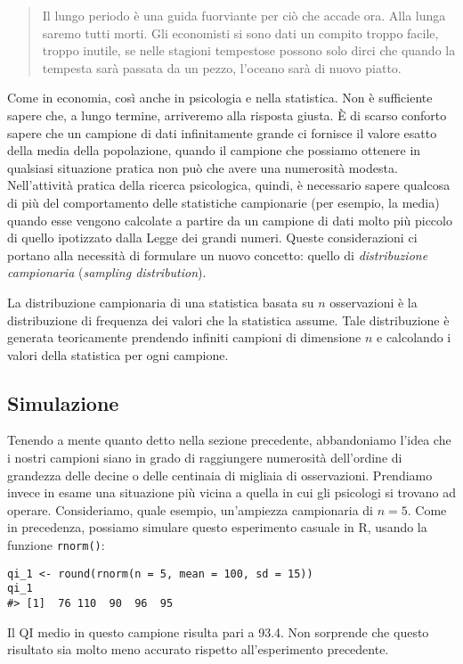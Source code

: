 \begin{quote}
Il lungo periodo è una guida fuorviante per ciò che accade ora.
Alla lunga saremo tutti morti.
Gli economisti si sono dati un compito troppo facile, troppo inutile, se nelle stagioni tempestose possono solo dirci che quando la tempesta sarà passata da un pezzo, l'oceano sarà di nuovo piatto.
\end{quote}

Come in economia, così anche in psicologia e nella statistica. 
Non è sufficiente sapere che, a lungo termine, arriveremo alla risposta giusta. 
È di scarso conforto sapere che un campione di dati infinitamente grande ci fornisce il valore esatto della media della popolazione, quando il campione che possiamo ottenere in qualsiasi situazione pratica non può che avere una numerosità modesta. 
Nell'attività pratica della ricerca psicologica, quindi, è necessario sapere qualcosa di più del comportamento delle statistiche campionarie (per esempio, la media) quando esse vengono calcolate a partire da un campione di dati molto più piccolo di quello ipotizzato dalla Legge dei grandi numeri.
Queste considerazioni ci portano alla necessità di formulare un nuovo concetto: quello di \emph{distribuzione campionaria} (\emph{sampling distribution}).

\begin{defn}
\label{def:sampling_distr}
La distribuzione campionaria di una statistica basata su $n$ osservazioni è la distribuzione di frequenza dei valori che la statistica assume. 
Tale distribuzione è generata teoricamente prendendo infiniti campioni di dimensione $n$ e calcolando i valori della statistica per ogni campione.
\end{defn}


\subsection{Simulazione}

Tenendo a mente quanto detto nella sezione precedente, abbandoniamo l'idea che i nostri campioni siano in grado di raggiungere numerosità dell'ordine di grandezza delle decine o delle centinaia di migliaia di osservazioni.
Prendiamo invece in esame una situazione più vicina a quella in cui gli psicologi si trovano ad operare. 
Consideriamo, quale esempio, un'ampiezza campionaria di $n = 5$.
Come in precedenza, possiamo simulare questo esperimento casuale in R, usando la funzione \verb+rnorm()+:
\begin{lstlisting}
qi_1 <- round(rnorm(n = 5, mean = 100, sd = 15))
qi_1
#> [1]  76 110  90  96  95
\end{lstlisting}
\noindent
Il QI medio in questo campione risulta pari a 93.4. 
Non sorprende che questo risultato sia molto meno accurato rispetto all'esperimento precedente.

